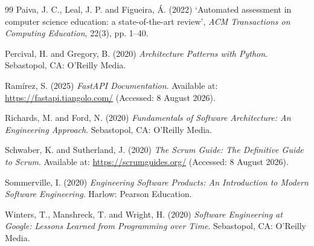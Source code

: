 \documentclass[a4paper,11pt]{article}
\begin{document}
\begin{thebibliography}{99}
Paiva, J. C., Leal, J. P. and Figueira, \'{A}. (2022) `Automated assessment in
computer science education: a state-of-the-art review', \textit{ACM
Transactions on Computing Education}, 22(3), pp. 1--40.

Percival, H. and Gregory, B. (2020) \textit{Architecture Patterns with Python}.
Sebastopol, CA: O'Reilly Media.

Ram\'{i}rez, S. (2025) \textit{FastAPI Documentation}. Available at:
\url{https://fastapi.tiangolo.com/} (Accessed: 8 August 2026).

Richards, M. and Ford, N. (2020) \textit{Fundamentals of Software Architecture:
An Engineering Approach}. Sebastopol, CA: O'Reilly Media.

Schwaber, K. and Sutherland, J. (2020) \textit{The Scrum Guide: The Definitive
Guide to Scrum}. Available at: \url{https://scrumguides.org/} (Accessed:
8 August 2026).

Sommerville, I. (2020) \textit{Engineering Software Products: An Introduction
to Modern Software Engineering}. Harlow: Pearson Education.

Winters, T., Manshreck, T. and Wright, H. (2020) \textit{Software Engineering
at Google: Lessons Learned from Programming over Time}. Sebastopol, CA:
O'Reilly Media.

\end{thebibliography}
\end{document}
